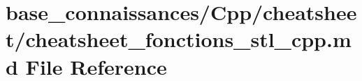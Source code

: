 \hypertarget{base__connaissances_2Cpp_2cheatsheet_2cheatsheet__fonctions__stl__cpp_8md}{}\section{base\+\_\+connaissances/\+Cpp/cheatsheet/cheatsheet\+\_\+fonctions\+\_\+stl\+\_\+cpp.md File Reference}
\label{base__connaissances_2Cpp_2cheatsheet_2cheatsheet__fonctions__stl__cpp_8md}
